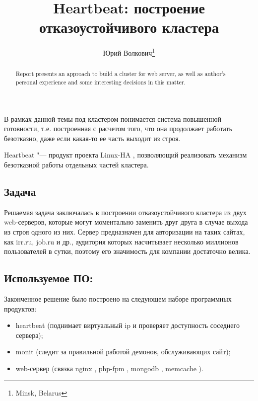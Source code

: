 \documentclass[10pt, a5paper]{article}
\begin{document}
\title{Heartbeat: построение отказоустойчивого кластера}

\author{Юрий Волкович\footnote{Minsk, Belarus}}
\maketitle

\begin{abstract}
Report presents an approach to build a cluster for web server, as well as author's personal experience and some interesting decisions in this matter.
\end{abstract}

В рамках данной темы под кластером понимается система повышенной готовности, т.е. построенная с расчетом того, что она продолжает работать безотказно, даже если какая-то ее часть выходит из строя.

Heartbeat "--- продукт проекта Linux-HA \cite{Volkovich1}, позволяющий реализовать механизм безотказной работы отдельных частей кластера.

\subsection*{Задача}

Решаемая задача заключалась в построении отказоустойчивого кластера из двух web-серверов, которые могут моментально заменить друг друга в случае выхода из строя одного из них. Сервер предназначен для авторизации на таких сайтах, как irr.ru, job.ru и др., аудитория которых насчитывает несколько миллионов пользователей в сутки, поэтому его значимость для компании достаточно велика.

\subsection*{Используемое ПО:}

Законченное решение было построено на следующем наборе программных продуктов:

\begin{itemize}
  \item heartbeat (поднимает виртуальный ip и проверяет доступность соседнего сервера);
  \item monit \cite{Volkovich2} (следит за правильной работой демонов, обслуживающих сайт);
  \item web-сервер (связка nginx \cite{Volkovich3}, php-fpm \cite{Volkovich4}, mongodb \cite{Volkovich5}, memcache \cite{Volkovich6}).
\end{itemize}
\end{document}
